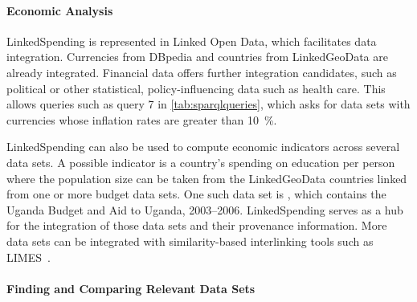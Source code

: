 \documentclass[sw]{iosart2x}
\begin{document}
\paragraph{Economic Analysis}
LinkedSpending is represented in Linked Open Data, which facilitates data integration.
Currencies from DBpedia and countries from LinkedGeoData are already integrated.
Financial data offers further integration candidates, such as political or other statistical, policy-influencing data such as health care.
This allows queries such as query 7 in \autoref{tab:sparqlqueries}, which asks for data sets with currencies whose inflation rates are greater than \SI{10}{\percent}.

LinkedSpending can also be used to compute economic indicators across several data sets.
A possible indicator is a country's spending on education per person where the population size can be taken from the LinkedGeoData countries linked from one or more budget data sets.
One such data set is , which contains the Uganda Budget and Aid to Uganda, 2003--2006.
LinkedSpending serves as a hub for the integration of those data sets and their provenance information.
More data sets can be integrated with similarity-based interlinking tools such as LIMES~\cite{NGON11}.

\paragraph{Finding and Comparing Relevant Data Sets} 
\end{document}
